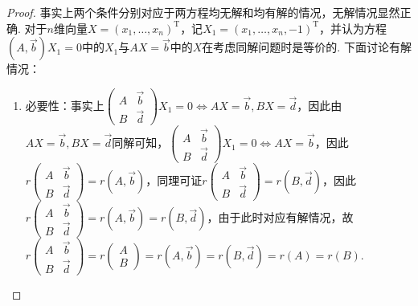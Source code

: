 \begin{proof}
    事实上两个条件分别对应于两方程均无解和均有解的情况，无解情况显然正确. 对于$n$维向量$X=(x_1,\ldots,x_n)^\mathrm{T}$，记$X_1=(x_1,\ldots,x_n,-1)^\mathrm{T}$，并认为方程$(A,\vec{b})X_1=0$中的$X_1$与$AX=\vec{b}$中的$X$在考虑同解问题时是等价的. 下面讨论有解情况：
    \begin{enumerate}
        \item 必要性：事实上$\begin{pmatrix}
                      A & \vec{b} \\ B & \vec{d}
                  \end{pmatrix}X_1=0\iff AX=\vec{b},BX=\vec{d}$，因此由$AX=\vec{b},BX=\vec{d}$同解可知，$\begin{pmatrix}
                      A & \vec{b} \\ B & \vec{d}
                  \end{pmatrix}X_1=0\iff AX=\vec{b}$，因此$r\begin{pmatrix}
                      A & \vec{b} \\ B & \vec{d}
                  \end{pmatrix}=r(A,\vec{b})$，同理可证$r\begin{pmatrix}
                      A & \vec{b} \\ B & \vec{d}
                  \end{pmatrix}=r(B,\vec{d})$，因此$r\begin{pmatrix}
                      A & \vec{b} \\ B & \vec{d}
                  \end{pmatrix}=r(A,\vec{b})=r(B,\vec{d})$，由于此时对应有解情况，故$r\begin{pmatrix}
                      A & \vec{b} \\ B & \vec{d}
                  \end{pmatrix}=r\begin{pmatrix}
                      A \\ B
                  \end{pmatrix}=r(A,\vec{b})=r(B,\vec{d})=r(A)=r(B)$.


\end{enumerate}
\end{proof}

